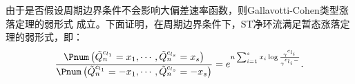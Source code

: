 


由于是否假设周期边界条件不会影响大偏差速率函数，则Gallavotti-Cohen类型涨落定理的弱形式 \cite{pedraza2008effects} 成立。下面证明，在周期边界条件下，ST净环流满足暂态涨落定理的弱形式，即：
\begin{equation}\label{weak2}
    \begin{split}
    \frac{\Pnum\left(\tilde{Q}^{c_{l_1}}_n=x_1,\cdots, \tilde{Q}^{c_{l_s}}_n=x_{s}\right)}
    {\Pnum\left(\tilde{Q}^{c_{l_1}}_n=-x_1,\cdots, \tilde{Q}^{c_{l_s}}_n=-x_{s}\right)}
    =e^{n\sum_{i=1}^{s}x_i\log\frac{\gamma^{c_{l_i}}}{\gamma^{c_{l_i}-}}}.
    \end{split}
\end{equation}
